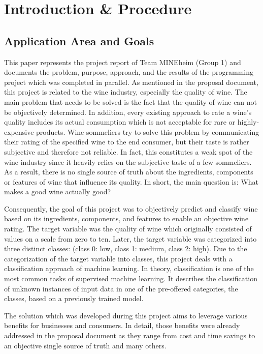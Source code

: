 \chapter{Introduction \& Procedure}
\section{Application Area and Goals}


This paper represents the project report of Team MINEheim (Group 1) and documents the problem, purpose, approach, and the results of the programming project which was completed in parallel. As mentioned in the proposal document, this project is related to the wine industry, especially the quality of wine. The main problem that needs to be solved is the fact that the quality of wine can not be objectively determined. In addition, every existing approach to rate a wine's quality includes its actual consumption which is not acceptable for rare or highly-expensive products. Wine sommeliers try to solve this problem by communicating their rating of the specified wine to the end consumer, but their taste is rather subjective and therefore not reliable. In fact, this constitutes a weak spot of the wine industry since it heavily relies on the subjective taste of a few sommeliers. As a result, there is no single source of truth about the ingredients, components or features of wine that influence its quality. In short, the main question is: What makes a good wine actually good?

Consequently, the goal of this project was to objectively predict and classify wine based on its ingredients, components, and features to enable an objective wine rating. The target variable was the quality of wine which originally consisted of values on a scale from zero to ten. Later, the target variable was categorized into three distinct classes: (class 0: low, class 1: medium, class 2: high). Due to the categorization of the target variable into classes, this project deals with a classification approach of machine learning. In theory, classification is one of the most common tasks of supervised machine learning. It describes the classification of unknown instances of input data in one of the pre-offered categories, the classes, based on a previously trained model. \citep{Novakovic2010}

The solution which was developed during this project aims to leverage various benefits for businesses and consumers. In detail, those benefits were already addressed in the proposal document as they range from cost and time savings to an objective single source of truth and many others. 